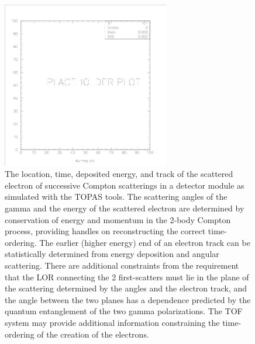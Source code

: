 %
\begin{figure}[!ht]
\centering
\includegraphics[angle=0,width=0.65\textwidth]{Figures/dummy.jpg}
\caption{The location, time, deposited energy, and track of the scattered electron of successive Compton scatterings in a detector module as simulated with the TOPAS tools. The scattering angles of the gamma and the energy of the scattered electron are determined by conservation of energy and momentum in the 2-body Compton process, providing handles on reconstructing the correct time-ordering. The earlier (higher energy) end of an electron track can be statistically determined from energy deposition and angular scattering. There are additional constraints from the requirement that the LOR connecting the 2 first-scatters must lie in the plane of the scattering determined by the angles and the electron track, and the angle between the two planes has a dependence predicted by the quantum entanglement of the two gamma polarizations. The TOF system may provide additional information constraining the time-ordering of the creation of the electrons. }
\label{fig:Compton_Chain}
\end{figure}
